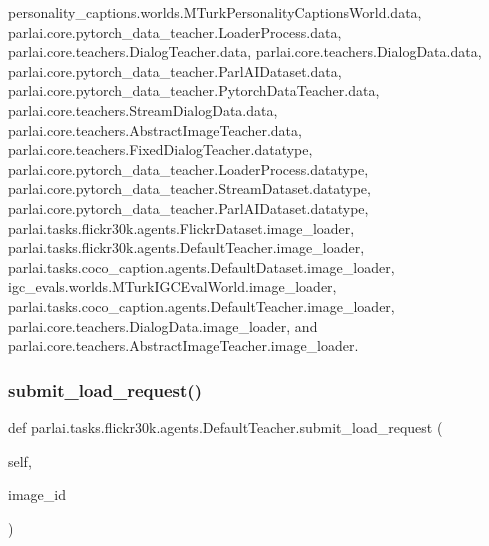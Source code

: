 personality\+\_\+captions.\+worlds.\+M\+Turk\+Personality\+Captions\+World.\+data, parlai.\+core.\+pytorch\+\_\+data\+\_\+teacher.\+Loader\+Process.\+data, parlai.\+core.\+teachers.\+Dialog\+Teacher.\+data, parlai.\+core.\+teachers.\+Dialog\+Data.\+data, parlai.\+core.\+pytorch\+\_\+data\+\_\+teacher.\+Parl\+A\+I\+Dataset.\+data, parlai.\+core.\+pytorch\+\_\+data\+\_\+teacher.\+Pytorch\+Data\+Teacher.\+data, parlai.\+core.\+teachers.\+Stream\+Dialog\+Data.\+data, parlai.\+core.\+teachers.\+Abstract\+Image\+Teacher.\+data, parlai.\+core.\+teachers.\+Fixed\+Dialog\+Teacher.\+datatype, parlai.\+core.\+pytorch\+\_\+data\+\_\+teacher.\+Loader\+Process.\+datatype, parlai.\+core.\+pytorch\+\_\+data\+\_\+teacher.\+Stream\+Dataset.\+datatype, parlai.\+core.\+pytorch\+\_\+data\+\_\+teacher.\+Parl\+A\+I\+Dataset.\+datatype, parlai.\+tasks.\+flickr30k.\+agents.\+Flickr\+Dataset.\+image\+\_\+loader, parlai.\+tasks.\+flickr30k.\+agents.\+Default\+Teacher.\+image\+\_\+loader, parlai.\+tasks.\+coco\+\_\+caption.\+agents.\+Default\+Dataset.\+image\+\_\+loader, igc\+\_\+evals.\+worlds.\+M\+Turk\+I\+G\+C\+Eval\+World.\+image\+\_\+loader, parlai.\+tasks.\+coco\+\_\+caption.\+agents.\+Default\+Teacher.\+image\+\_\+loader, parlai.\+core.\+teachers.\+Dialog\+Data.\+image\+\_\+loader, and parlai.\+core.\+teachers.\+Abstract\+Image\+Teacher.\+image\+\_\+loader.

\mbox{\label{classparlai_1_1tasks_1_1flickr30k_1_1agents_1_1DefaultTeacher_aac22712a270cb75686f9595913ab6970}} 
\subsubsection{\texorpdfstring{submit\+\_\+load\+\_\+request()}{submit\_load\_request()}}
{\footnotesize\ttfamily def parlai.\+tasks.\+flickr30k.\+agents.\+Default\+Teacher.\+submit\+\_\+load\+\_\+request (\begin{DoxyParamCaption}\item[{}]{self,  }\item[{}]{image\+\_\+id }\end{DoxyParamCaption})}



